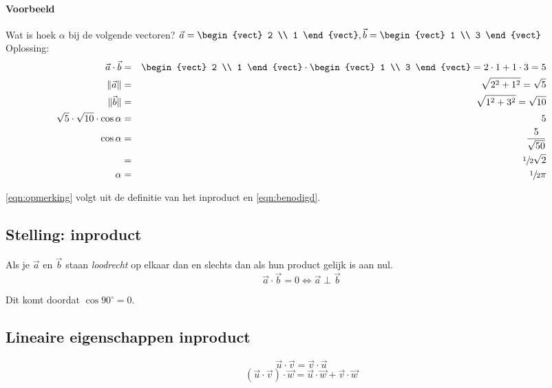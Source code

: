 \paragraph{Voorbeeld}
Wat is hoek $\alpha$ bij de volgende vectoren?
$\vec{a} = \begin{vect} 2 \\ 1 \end{vect}, \vec{b} = \begin{vect} 1 \\ 3 \end{vect}$ \\
Oplossing:
\begin{eqnarray}
	\vec{a} \cdot \vec{b} &=& \begin{vect} 2 \\ 1 \end{vect} \cdot \begin{vect} 1 \\ 3 \end{vect} = 2 \cdot 1 + 1 \cdot 3 = 5 \label{eqn:benodigd} \\
	\|\vec{a}\| &=& \sqrt{2^2 + 1^2} = \sqrt{5} \\
	\|\vec{b}\| &=& \sqrt{1^2 + 3^2} = \sqrt{10} \\
	\sqrt{5} \cdot \sqrt{10} \cdot \cos \alpha &=& 5 \label{eqn:opmerking} \\
	\cos \alpha &=& \frac{5}{\sqrt{50}} \\
	&=& \sfrac{1}{2}\sqrt{2} \\
	\alpha &=& \sfrac{1}{2} \pi
\end{eqnarray}

\autoref{eqn:opmerking} volgt uit de definitie van het inproduct en \autoref{eqn:benodigd}.
\subsection{Stelling: inproduct}
Als je $\vec{a}$ en $\vec{b}$ staan \emph{loodrecht}  op elkaar dan en slechts dan als hun product gelijk is aan nul.
\[ \vec{a} \cdot \vec{b} = 0 \iff \vec{a} \perp \vec{b} \]

Dit komt doordat $\cos 90^\circ = 0$.

\subsection{Lineaire eigenschappen inproduct}
\[ \vec{u} \cdot \vec{v} = \vec{v} \cdot \vec{u} \]
\[ (\vec{u} \cdot \vec{v}) \cdot \vec{w} = \vec{u} \cdot \vec{w} + \vec{v} \cdot \vec{w} \]

